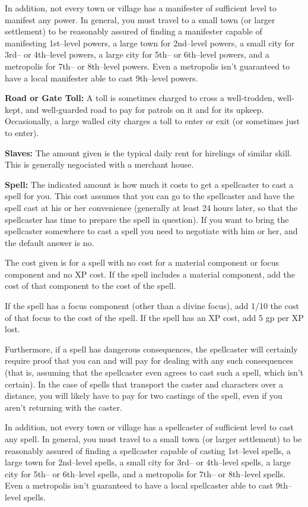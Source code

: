 In addition, not every town or village has a manifester of sufficient level to manifest any power. In general, you must travel to a small town (or larger settlement) to be reasonably assured of finding a manifester capable of manifesting 1st--level powers, a large town for 2nd--level powers, a small city for 3rd-- or 4th--level powers, a large city for 5th-- or 6th--level powers, and a metropolis for 7th-- or 8th--level powers. Even a metropolis isn't guaranteed to have a local manifester able to cast 9th--level powers.

\textbf{Road or Gate Toll:} A toll is sometimes charged to cross a well-trodden, well-kept, and well-guarded road to pay for patrols on it and for its upkeep. Occasionally, a large walled city charges a toll to enter or exit (or sometimes just to enter).

\textbf{Slaves:} The amount given is the typical daily rent for hirelings of similar skill. This is generally negociated with a merchant house.

\textbf{Spell:} The indicated amount is how much it costs to get a spellcaster to cast a spell for you. This cost assumes that you can go to the spellcaster and have the spell cast at his or her convenience (generally at least 24 hours later, so that the spellcaster has time to prepare the spell in question). If you want to bring the spellcaster somewhere to cast a spell you need to negotiate with him or her, and the default answer is no.

The cost given is for a spell with no cost for a material component or focus component and no XP cost. If the spell includes a material component, add the cost of that component to the cost of the spell.

If the spell has a focus component (other than a divine focus), add 1/10 the cost of that focus to the cost of the spell. If the spell has an XP cost, add 5 gp per XP lost.

Furthermore, if a spell has dangerous consequences, the spellcaster will certainly require proof that you can and will pay for dealing with any such consequences (that is, assuming that the spellcaster even agrees to cast such a spell, which isn't certain). In the case of spells that transport the caster and characters over a distance, you will likely have to pay for two castings of the spell, even if you aren't returning with the caster.

In addition, not every town or village has a spellcaster of sufficient level to cast any spell. In general, you must travel to a small town (or larger settlement) to be reasonably assured of finding a spellcaster capable of casting 1st--level spells, a large town for 2nd--level spells, a small city for 3rd-- or 4th--level spells, a large city for 5th-- or 6th--level spells, and a metropolis for 7th-- or 8th--level spells. Even a metropolis isn't guaranteed to have a local spellcaster able to cast 9th--level spells.